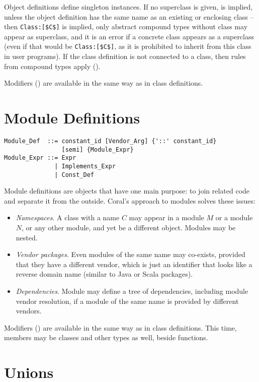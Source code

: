 Object definitions define singleton instances. If no superclass is given,  is implied, unless the object definition has the same name as an existing or enclosing class -- then \lstinline!Class:[$C$]! is implied, only abstract compound types without class may appear as superclass, and it is an error if a concrete class appears as a superclass (even if that would be \lstinline!Class:[$C$]!, as it is prohibited to inherit from this class in user programs). If the class definition is not connected to a class, then rules from compound types apply ().

Modifiers () are available in the same way as in class definitions. 

\section{Module Definitions}
\label{sec:module-definitions}

\syntax\begin{lstlisting}
Module_Def  ::= constant_id [Vendor_Arg] {'::' constant_id} 
                [semi] {Module_Expr}
Module_Expr ::= Expr
              | Implements_Expr
              | Const_Def
\end{lstlisting}

Module definitions are objects that have one main purpose: to join related code and separate it from the outside. Coral's approach to modules solves these issues: 
\begin{itemize}
\item {\em Namespaces}. A class with a name $C$ may appear in a module $M$ or a module $N$, or any other module, and yet be a different object. Modules may be nested.
\item {\em Vendor packages}. Even modules of the same name may co-exists, provided that they have a different vendor, which is just an identifier that looks like a reverse domain name (similar to Java or Scala packages). 
\item {\em Dependencies}. Module may define a tree of dependencies, including module vendor resolution, if a module of the same name is provided by different vendors. 
\end{itemize}

Modifiers () are available in the same way as in class definitions. This time, members may be classes and other types as well, beside functions. 
\section{Unions}
\label{sec:unions}

